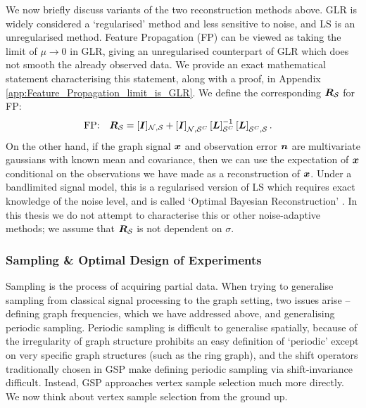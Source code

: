 We now briefly discuss variants of the two reconstruction methods above. GLR is widely considered a `regularised' method and less sensitive to noise, and LS is an unregularised method. Feature Propagation  \cite{rossi2021unreasonable} (FP) can be viewed as taking the limit of $\mu \to 0$ in GLR, giving an unregularised counterpart of GLR which does not smooth the already observed data. We provide an exact mathematical statement characterising this statement, along with a proof, in Appendix \ref{app:Feature_Propagation_limit_is_GLR}. We define the corresponding $\bm{R}_{\mathcal{S}}$ for FP:
    \begin{align}
    \textrm{FP:\quad} \matr{R}_{\set{S}} &= \matrsub[N,S]{I} + \msubgen[\set{N},\set{S}^{C}]{\matr{I}}\msubgen[\set{S}^{C}]{\matr{L}}^{-1}\msubgen[\set{S}^{C},\set{S}]{\matr{L}}.\label{eq:defn_RS:FP}
    \end{align}
On the other hand, if the graph signal $\bm{x}$ and observation error $\bm{n}$ are multivariate gaussians with known mean and covariance, then we can use the expectation of $\bm{x}$ conditional on the observations we have made as a reconstruction of $\bm{x}$. Under a bandlimited signal model, this is a regularised version of LS which requires exact knowledge of the noise level, and is called `Optimal Bayesian Reconstruction' \cite{chamon2017greedy}. In this thesis we do not attempt to characterise this or other noise-adaptive methods; we assume that $\bm{R}_{\mathcal{S}}$ is not dependent on $\sigma$.

\subsubsection{Sampling \& Optimal Design of Experiments}
Sampling is the process of acquiring partial data. When trying to generalise sampling from classical signal processing to the graph setting, two issues arise \cite{tanaka2020sampling} -- defining graph frequencies, which we have addressed above, and generalising periodic sampling. Periodic sampling is difficult to generalise spatially, because of the irregularity of graph structure prohibits an easy definition of `periodic' except on very specific graph structures (such as the ring graph), and the shift operators traditionally chosen in GSP make defining periodic sampling via shift-invariance difficult. Instead, GSP approaches vertex sample selection much more directly. We now think about vertex sample selection from the ground up.

